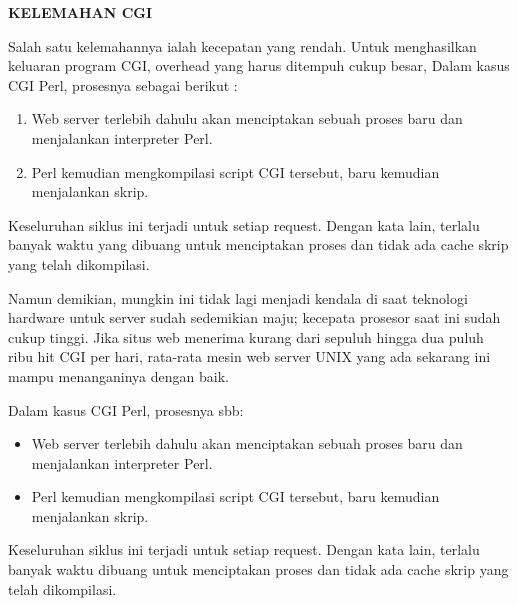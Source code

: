 \par
\vspace{12pt}
\noindent 
\textbf{KELEMAHAN CGI} \par
Salah satu kelemahannya ialah kecepatan yang rendah. Untuk menghasilkan keluaran program CGI, overhead yang harus ditempuh cukup besar, Dalam kasus CGI Perl, prosesnya sebagai berikut : \par
\noindent 
\begin{enumerate}
	\item Web server terlebih dahulu akan menciptakan sebuah proses baru dan menjalankan interpreter Perl.
	\item Perl kemudian mengkompilasi script CGI tersebut, baru kemudian menjalankan skrip.\end{enumerate}
\par
\vspace{12pt}
Keseluruhan siklus ini terjadi untuk setiap request. Dengan kata lain, terlalu banyak waktu yang dibuang untuk menciptakan proses dan tidak ada cache skrip yang telah dikompilasi. \par
\vspace{12pt}
Namun demikian, mungkin ini tidak lagi menjadi kendala di saat teknologi hardware untuk server sudah sedemikian maju; kecepata prosesor saat ini sudah cukup tinggi. Jika situs web menerima kurang dari sepuluh hingga dua puluh ribu hit CGI per hari, rata-rata mesin web server UNIX yang ada sekarang ini mampu menanganinya dengan baik. \par
\vspace{12pt}
\vspace{12pt}
\vspace{12pt}
\vspace{12pt}
\noindent 
Dalam kasus CGI Perl, prosesnya sbb: \par
\noindent 
\begin{itemize}
	\item Web server terlebih dahulu akan menciptakan sebuah proses baru dan menjalankan interpreter Perl.  \par
	\noindent 
	\item Perl kemudian mengkompilasi script CGI tersebut, baru kemudian menjalankan skrip.\end{itemize}
\par
\noindent 
Keseluruhan siklus ini terjadi untuk setiap request. Dengan kata lain, terlalu banyak waktu dibuang untuk menciptakan proses dan tidak ada cache skrip yang telah dikompilasi. \par
